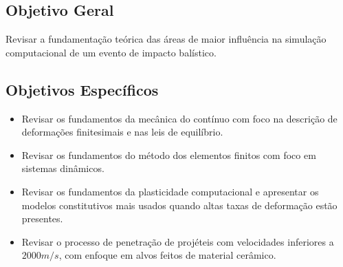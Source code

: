 \subsection{Objetivo Geral}

Revisar a fundamentação teórica das áreas de maior influência na simulação computacional de um evento de impacto balístico.

\subsection{Objetivos Específicos}

\begin{itemize}
    \item Revisar os fundamentos da mecânica do contínuo com foco na descrição de deformações finitesimais e nas leis de equilíbrio.
    \item Revisar os fundamentos do método dos elementos finitos com foco em sistemas dinâmicos.
    \item Revisar os fundamentos da plasticidade computacional e apresentar os modelos constitutivos mais usados quando altas taxas de deformação estão presentes.
    \item Revisar o processo de penetração de projéteis com velocidades inferiores a $2000 m/s$, com enfoque em alvos feitos de material cerâmico.
\end{itemize}